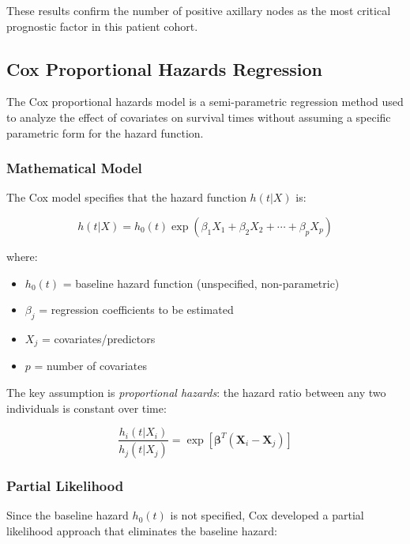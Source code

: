\documentclass[12pt,a4paper]{article}
\begin{document}
These results confirm the number of positive axillary nodes as the most critical prognostic factor in this patient cohort.

\subsection{Cox Proportional Hazards Regression}

The Cox proportional hazards model is a semi-parametric regression method used to analyze the effect of covariates on survival times without assuming a specific parametric form for the hazard function.

\subsubsection{Mathematical Model}

The Cox model specifies that the hazard function \(h(t|X)\) is:

\begin{equation}
h(t|X) = h_0(t) \exp(\beta_1 X_1 + \beta_2 X_2 + \cdots + \beta_p X_p)
\label{eq:cox_model}
\end{equation}

where:
\begin{itemize}
    \item \(h_0(t)\) = baseline hazard function (unspecified, non-parametric)
    \item \(\beta_j\) = regression coefficients to be estimated
    \item \(X_j\) = covariates/predictors
    \item \(p\) = number of covariates
\end{itemize}

The key assumption is \textit{proportional hazards}: the hazard ratio between any two individuals is constant over time:

\begin{equation}
\frac{h_i(t|X_i)}{h_j(t|X_j)} = \exp[\boldsymbol{\beta}^T(\mathbf{X}_i - \mathbf{X}_j)]
\label{eq:proportional_hazards}
\end{equation}

\subsubsection{Partial Likelihood}

Since the baseline hazard \(h_0(t)\) is not specified, Cox developed a partial likelihood approach that eliminates the baseline hazard:
\end{document}
